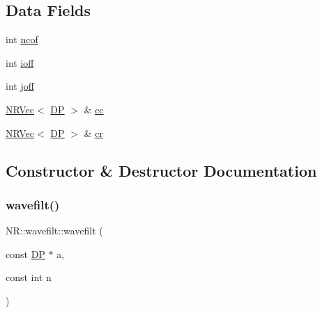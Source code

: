 \subsection*{Data Fields}
\begin{DoxyCompactItemize}
\item 
int \mbox{\hyperlink{classNR_1_1wavefilt_ae9ed314d698a843e2bbf723b2463d2e8}{ncof}}
\item 
int \mbox{\hyperlink{classNR_1_1wavefilt_acc0fda6a300680212528c1c318a3471a}{ioff}}
\item 
int \mbox{\hyperlink{classNR_1_1wavefilt_ae84da52274e02386b4a0192353ac8553}{joff}}
\item 
\mbox{\hyperlink{classNR_1_1NRVec}{N\+R\+Vec}}$<$ \mbox{\hyperlink{namespaceNR_af6ff762dd605ff477b8e52387253a02a}{DP}} $>$ \& \mbox{\hyperlink{classNR_1_1wavefilt_aa4d0e1e40a8f4ea6f18f244241cca8d1}{cc}}
\item 
\mbox{\hyperlink{classNR_1_1NRVec}{N\+R\+Vec}}$<$ \mbox{\hyperlink{namespaceNR_af6ff762dd605ff477b8e52387253a02a}{DP}} $>$ \& \mbox{\hyperlink{classNR_1_1wavefilt_a57c5c653f23d5591340255ee4fe80c3a}{cr}}
\end{DoxyCompactItemize}


\subsection{Constructor \& Destructor Documentation}
\mbox{\label{classNR_1_1wavefilt_aaa684e296af599915cdf4e0963b663c0}} 
\subsubsection{\texorpdfstring{wavefilt()}{wavefilt()}\hspace{0.1cm}{\footnotesize\ttfamily [1/2]}}
{\footnotesize\ttfamily N\+R\+::wavefilt\+::wavefilt (\begin{DoxyParamCaption}\item[{const \mbox{\hyperlink{namespaceNR_af6ff762dd605ff477b8e52387253a02a}{DP}} $\ast$}]{a,  }\item[{const int}]{n }\end{DoxyParamCaption})\hspace{0.3cm}{\ttfamily [inline]}}

\mbox{\label{classNR_1_1wavefilt_a9d223dd0fb637f3f511510b5efd9c6f6}} 
